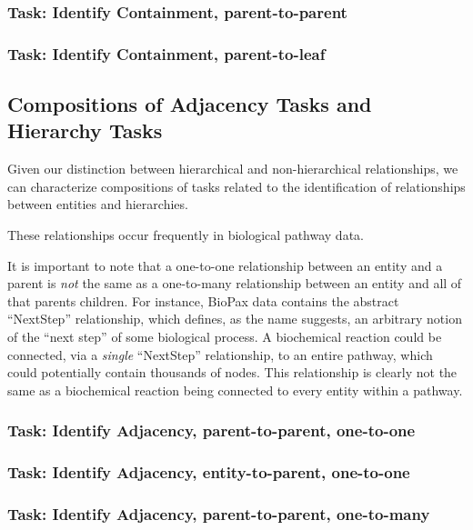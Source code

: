 \documentclass{egpubl}
\begin{document}

\subsubsection{Task: Identify Containment, parent-to-parent}
\subsubsection{Task: Identify Containment, parent-to-leaf}

\subsection{Compositions of Adjacency Tasks and Hierarchy Tasks}
Given our distinction between hierarchical and non-hierarchical relationships, we can characterize compositions of tasks related to the identification of relationships between entities and hierarchies.

These relationships occur frequently in biological pathway data.


It is important to note that a one-to-one relationship between an entity and a parent is \textit{not} the same as a one-to-many relationship between an entity and all of that parents children.
For instance, BioPax data contains the abstract ``NextStep'' relationship, which defines, as the name suggests, an arbitrary notion of the ``next step'' of some biological process.
A biochemical reaction could be connected, via a \textit{single} ``NextStep'' relationship, to an entire pathway, which could potentially contain thousands of nodes.
This relationship is clearly not the same as a biochemical reaction being connected to every entity within a pathway.

\subsubsection{Task: Identify Adjacency, parent-to-parent, one-to-one}
\subsubsection{Task: Identify Adjacency, entity-to-parent, one-to-one}
\subsubsection{Task: Identify Adjacency, parent-to-parent, one-to-many}
\end{document}
